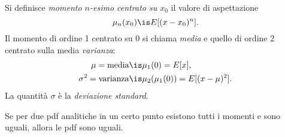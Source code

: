 \begin{definition}[Momenti]
	Si definisce \emph{momento $n$-esimo centrato su $x_0$} il valore di aspettazione
	\begin{equation*}
		\mu_n(x_0) \is E[(x - x_0)^n].
	\end{equation*}
	Il momento di ordine 1 centrato su 0 si chiama \emph{media} e quello di ordine 2 centrato sulla media \emph{varianza}:
	\begin{align*}
		\mu = \text{media} &\is \mu_1(0) = E[x], \\
		\sigma^2 = \text{varianza} &\is \mu_2(\mu_1(0)) = E[(x-\mu)^2].
	\end{align*}
	La quantità $\sigma$ è la \emph{deviazione standard}.
\end{definition}

\begin{fact}
	\label{th:pdfmom}
	Se per due pdf analitiche in un certo punto esistono tutti i momenti e sono uguali, allora le pdf sono uguali.
\end{fact}

